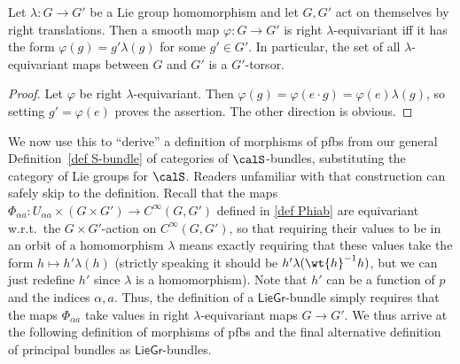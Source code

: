 \begin{prop}\label{prop lambda-equiv maps}
    Let $\lambda:G\to G'$ be a Lie group homomorphism and let $G,G'$ act on themselves by right translations. Then a smooth map $\varphi:G\to G'$ is right $\lambda$-equivariant iff it has the form $\varphi(g)=g'\lambda(g)$ for some $g'\in G'$. In particular, the set of all $\lambda$-equivariant maps between $G$ and $G'$ is a $G'$-torsor.
\end{prop}
\begin{proof}
    Let $\varphi$ be right $\lambda$-equivariant. Then
    $\varphi(g)=\varphi(e\cdot g)=\varphi(e)\lambda(g)$,
    so setting $g'=\varphi(e)$ proves the assertion. The other direction is obvious.
\end{proof}

We now use this to ``derive'' a definition of morphisms of \glspl{pfb} from our general Definition~\ref{def S-bundle} of categories of $\calS$-bundles, substituting the category of Lie groups for $\calS$. Readers unfamiliar with that construction can safely skip to the definition. Recall that the maps $\Phi_{\alpha a}:U_{\alpha a}\times (G\times G')\to C^\infty(G,G')$ defined in \eqref{def Phiab} are equivariant w.r.t.\ the $G\times G'$-action on $C^\infty(G,G')$, so that requiring their values to be in an orbit of a homomorphism $\lambda$ means exactly requiring that these values take the form $h\mapsto h'\lambda (h)$ (strictly speaking it should be $h'\lambda(\wt{h}^{-1}h)$, but we can just redefine $h'$ since $\lambda$ is a homomorphism). Note that $h'$ can be a function of $p$ and the indices $\alpha,a$. Thus, the definition of a $\mathsf{LieGr}$-bundle simply requires that the maps $\Phi_{\alpha a}$ take values in right $\lambda$-equivariant maps $G\to G'$. We thus arrive at the following definition of morphisms of \glspl{pfb} and the final alternative definition of principal bundles as $\mathsf{LieGr}$-bundles.




